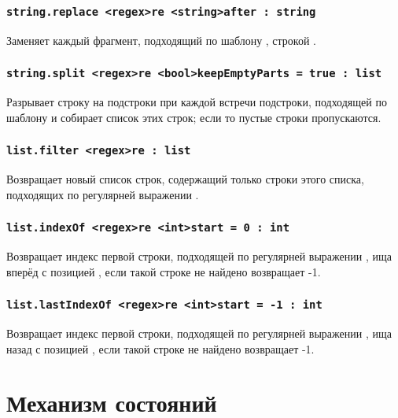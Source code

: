 \documentclass[a4paper, 14pt]{extarticle}
\begin{document}
\subsubsection{\lstinline|string.replace <regex>re <string>after : string|}

Заменяет каждый фрагмент, подходящий по шаблону , строкой .

\subsubsection{\lstinline|string.split <regex>re <bool>keepEmptyParts = true : list|}

Разрывает строку на подстроки при каждой встречи подстроки, подходящей по шаблону  и собирает список этих строк; если  то пустые строки пропускаются.

\subsubsection{\lstinline|list.filter <regex>re : list|}

Возвращает новый список строк, содержащий только строки этого списка, подходящих по регулярней выражении .

\subsubsection{\lstinline|list.indexOf <regex>re <int>start = 0 : int|}

Возвращает индекс первой строки, подходящей по регулярней выражении , ища вперёд с позицией , если такой строке не найдено возвращает -1.

\subsubsection{\lstinline|list.lastIndexOf <regex>re <int>start = -1 : int|}

Возвращает индекс первой строки, подходящей по регулярней выражении , ища назад с позицией , если такой строке не найдено возвращает -1.


\section{Механизм состояний}
\end{document}
